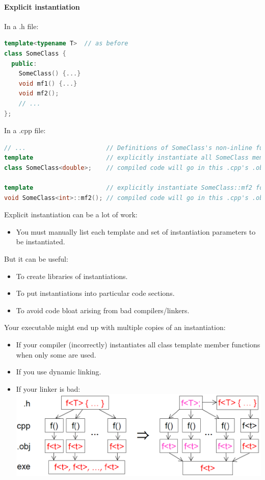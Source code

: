 \paragraph{Explicit instantiation}
In a .h file:
\begin{lstlisting}[language=C++]
template<typename T>  // as before
class SomeClass {
  public:
    SomeClass() {...}
    void mf1() {...}
    void mf2();
    // ...
};
\end{lstlisting}
In a .cpp file:
\begin{lstlisting}[language=C++]
// ...                      // Definitions of SomeClass's non-inline functions go here
template                    // explicitly instantiate all SomeClass member funcs for T=double
class SomeClass<double>;    // compiled code will go in this .cpp's .obj file

template                    // explicitly instantiate SomeClass::mf2 for T=int
void SomeClass<int>::mf2(); // compiled code will go in this .cpp's .obj file
\end{lstlisting}

Explicit instantiation can be a lot of work:
\begin{itemize}
  \item You must manually list each template and set of instantiation parameters to be instantiated.
\end{itemize}
But it can be useful:
\begin{itemize}
  \item To create libraries of instantiations.
  \item To put instantiations into particular code sections.
  \item To avoid code bloat arising from bad compilers/linkers.
\end{itemize}

Your executable might end up with multiple copies of an instantiation:
\begin{itemize}
  \item If your compiler (incorrectly) instantiates all class template member functions when only some are used.
  \item If you use dynamic linking.
  \item If your linker is bad:\\
  \includegraphics[width=0.6\linewidth]{images/AdvancedCPP/badLinker}
\end{itemize}

